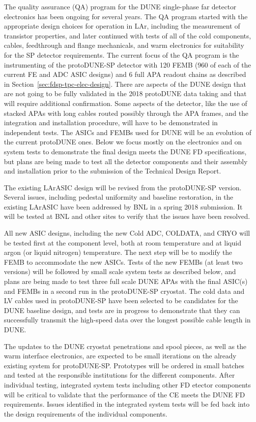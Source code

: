 The quality assurance (QA) program for the DUNE single-phase far detector electronics has been ongoing for several years.  The QA program started with the appropriate design choices for operation
in LAr, including the measurement of transistor properties, and later
continued with tests of all of the cold components, cables, feedthrough and flange mechanicals, and warm electronics for suitability for the SP detector requirements.  The current focus of the QA program is the instrumenting of the protoDUNE-SP detector with 120 FEMB (960 of each of the current FE and ADC ASIC designs) and 6 full APA readout chains as described in Section~\ref{sec:fdsp-tpc-elec-design}. There are aspects of the DUNE design that are not going to be fully validated in the 2018 protoDUNE data taking and that will require additional confirmation. Some aspects of the detector, like the use of stacked APAs with long cables routed possibly through the APA frames, and the integration and installation procedure, will have to be demonstrated in independent tests. The ASICs and FEMBs used for DUNE will be an evolution of the current protoDUNE ones. Below we focus mostly on the electronics and on system tests to demonstrate the final design meets the DUNE FD specifications, but plans are being made to test all the detector components and their assembly and installation prior to the submission of the Technical Design Report.

The existing LArASIC design will be revised from the protoDUNE-SP version. Several issues, 
including pedestal uniformity and baseline restoration, in the existing LArASIC have been 
addressed by BNL in a spring 2018 submission. It will be tested at BNL and other sites to 
verify that the issues have been resolved. 

All new ASIC designs, including the new Cold ADC, COLDATA, and CRYO will be tested first at the component level, both at room temperature and at liquid argon (or liquid nitrogen) temperature. The next step will be to modify the FEMB to accommodate the new ASICs.  Tests of the new FEMBs (at least two versions) will be followed by small scale system tests as described below, and plans are being made to test three full scale DUNE APAs with the final ASIC(s) and FEMBs in a second run in the protoDUNE-SP cryostat.  The cold data and LV cables used in protoDUNE-SP have been selected to be candidates for the DUNE baseline design, and tests are in progress to demonstrate that they can successfully transmit the high-speed data over the longest possible cable length in DUNE.

The updates to the DUNE cryostat penetrations and spool pieces, as well as the warm interface electronics, are expected to be small iterations on the already existing system for protoDUNE-SP.  Prototypes will be ordered in small batches and tested at the responsible institutions for the different components.  After individual testing, integrated system tests including other FD etector components will be critical to validate that the performance of the CE meets the DUNE FD requirements.  Issues identified in the integrated system tests will be fed back into the design requirements of the individual components.


